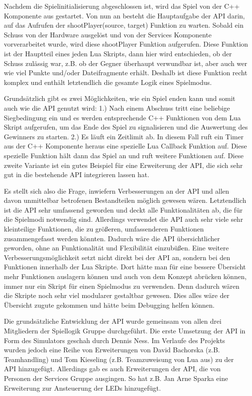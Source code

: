Nachdem die Spielinitialisierung abgeschlossen ist, wird das Spiel von der C++ Komponente
aus gestartet. Von nun an besteht die Hauptaufgabe der API darin, auf das Aufrufen der
shootPlayer(source, target) Funktion zu warten. Sobald ein Schuss von der Hardware
ausgelöst und von der Services Komponente vorverarbeitet wurde, wird diese shootPlayer
Funktion aufgerufen. Diese Funktion ist der Hauptteil eines jeden Lua Skripts, dann hier
wird entschieden, ob der Schuss zulässig war, z.B. ob der Gegner überhaupt verwundbar ist,
aber auch wer wie viel Punkte und/oder Dateifragmente erhält. Deshalb ist diese Funktion
recht komplex und enthält letztendlich die gesamte Logik eines Spielmodus.

Grundsätzlich gibt es zwei Möglichkeiten, wie ein Spiel enden kann und somit auch wie die
API genutzt wird: 1.) Nach einem Abschuss tritt eine beliebige Siegbedingung ein und es
werden entsprechende C++ Funktionen von dem Lua Skript aufgerufen, um das Ende des
Spiel zu signalisieren und die Auswertung des Gewinners zu starten. 2.) Es läuft ein Zeitlimit
ab. In diesem Fall ruft ein Timer aus der C++ Komponente heraus eine spezielle Lua Callback Funktion auf. Diese spezielle Funktion hält dann das Spiel an und ruft weitere Funktionen auf. Diese zweite Variante ist ein gutes Beispiel für eine Erweiterung der API, die sich sehr gut in die bestehende API integrieren lassen hat.

Es stellt sich also die Frage, inwiefern Verbesserungen an der API und allen davon unmittelbar betrofenen Bestandteilen möglich gewesen wären. Letztendlich ist die API sehr umfassend geworden und deckt alle Funktionalitäten ab, die für die Spielmodi notwendig sind. Allerdings verwendet die API auch sehr viele sehr kleinteilige Funktionen, die zu größeren, umfassenderen Funktionen zusammengefasst werden könnten. Dadurch wäre die API übersichtlicher geworden, ohne an Funktionalität und Flexibilität einzubüßen.
Eine weitere Verbesserungsmöglichkeit setzt nicht direkt bei der API an, sondern bei den
Funktionen innerhalb der Lua Skripte. Dort hätte man für eine bessere Übersicht mehr
Funktionen auslagern können und auch von dem Konzept abrücken können, immer nur ein
Skript für einen Spielmodus zu verwenden. Denn dadurch wären die Skripte noch sehr viel
modularer gestaltbar gewesen. Dies alles wäre der Übersicht zugute gekommen und hätte
beim Debugging helfen können.

Die grundsätzliche Entwicklung der API wurde gemeinsam von allen drei Mitgliedern der
Spiellogik Gruppe durchgeführt. Die erste Umsetzung der API in Form des Simulators
geschah durch Dennis Ness. Im Verlaufe des Projekts wurden jedoch eine Reihe von
Erweiterungen von David Bachorska (z.B. Teamhandling) und Tom Kieseling (z.B.
Teamzuweisung von Lua aus) zu der API hinzugefügt. Allerdings gab es auch Erweiterungen
der API, die von Personen der Services Gruppe ausgingen. So hat z.B. Jan Arne Sparka eine Erweiterung zur Ansteuerung der LEDs hinzugefügt.
